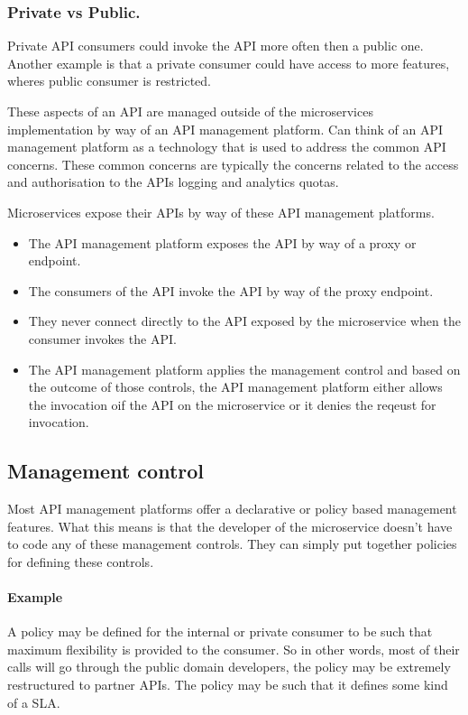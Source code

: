 \documentclass[a4paper, 11pt]{book}
\begin{document}
    \subsubsection{Private vs Public.}
    Private API consumers could invoke the API more often then a public one.
    Another example is that a private consumer could have access to more features, wheres public consumer is restricted.

    These aspects of an API are managed outside of the microservices implementation by way of an API management platform.
    Can think of an API management platform as a technology that is used to address the common API concerns.
    These common concerns are typically the concerns related to the access and authorisation to the APIs logging and analytics quotas.

    Microservices expose their APIs by way of these API management platforms.
    \begin{itemize}
        \item The API management platform exposes the API by way of a proxy or endpoint.
        \item The consumers of the API invoke the API by way of the proxy endpoint.
        \item They never connect directly to the API exposed by the microservice when the consumer invokes the API.
        \item The API management platform applies the management control and based on the outcome of those controls, the API management platform either allows the invocation oif the API on the microservice or it denies the reqeust for invocation.
    \end{itemize}

    \subsection{Management control}
    Most API management platforms offer a declarative or policy based management features.
    What this means is that the developer of the microservice doesn't have to code any of these management controls.
    They can simply put together policies for defining these controls.

    \paragraph{Example} A policy may be defined for the internal or private consumer to be such that maximum flexibility is provided to the consumer.
    So in other words, most of their calls will go through the public domain developers, the policy may be extremely restructured to partner APIs.
    The policy may be such that it defines some kind of a SLA.
\end{document}
